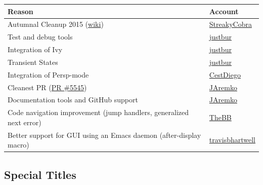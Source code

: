\documentclass[11pt]{article}
\begin{document}
\begin{center}
\begin{tabular}{ll}
Reason & Account\\
\hline
Autumnal Cleanup 2015 (\href{https://github.com/syl20bnr/spacemacs/wiki/Autumnal-Cleanup-2015}{wiki}) & \href{https://github.com/StreakyCobra}{StreakyCobra}\\
Test and debug tools & \href{https://github.com/justbur}{justbur}\\
Integration of Ivy & \href{https://github.com/justbur}{justbur}\\
Transient States & \href{https://github.com/justbur}{justbur}\\
Integration of Persp-mode & \href{https://github.com/CestDiego}{CestDiego}\\
Cleanest PR (\href{https://github.com/syl20bnr/spacemacs/pull/5545}{PR \#5545}) & \href{https://github.com/JAremko}{JAremko}\\
Documentation tools and GitHub support & \href{https://github.com/JAremko}{JAremko}\\
Code navigation improvement (jump handlers, generalized next error) & \href{https://github.com/TheBB}{TheBB}\\
Better support for GUI using an Emacs daemon (after-display macro) & \href{https://github.com/travisbhartwell}{travisbhartwell}\\
\end{tabular}
\end{center}

\subsection{Special Titles}
\label{sec:org7472885}
\end{document}

